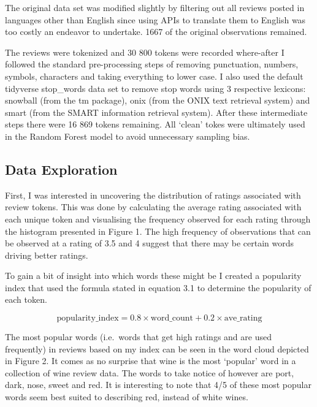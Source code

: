\documentclass[11pt,preprint]{elsarticle}
\numberwithin{equation}{section}
\numberwithin{figure}{section}
\numberwithin{table}{section}
\begin{document}
The original data set was modified slightly by filtering out all reviews
posted in languages other than English since using APIs to translate
them to English was too costly an endeavor to undertake. 1667 of the
original observations remained.

The reviews were tokenized and 30 800 tokens were recorded where-after I
followed the standard pre-processing steps of removing punctuation,
numbers, symbols, characters and taking everything to lower case. I also
used the default tidyverse stop\_words data set to remove stop words
using 3 respective lexicons: snowball (from the tm package), onix (from
the ONIX text retrieval system) and smart (from the SMART information
retrieval system). After these intermediate steps there were 16 869
tokens remaining. All `clean' tokes were ultimately used in the Random
Forest model to avoid unnecessary sampling bias.

\subsection{Data Exploration}\label{data-exploration}

First, I was interested in uncovering the distribution of ratings
associated with review tokens. This was done by calculating the average
rating associated with each unique token and visualising the frequency
observed for each rating through the histogram presented in Figure 1.
The high frequency of observations that can be observed at a rating of
3.5 and 4 suggest that there may be certain words driving better
ratings.

To gain a bit of insight into which words these might be I created a
popularity index that used the formula stated in equation 3.1 to
determine the popularity of each token.

\begin{equation}
    \text{popularity\_index} = 0.8 \times \text{word\_count} + 0.2 \times \text{ave\_rating}
\end{equation}

The most popular words (i.e.~words that get high ratings and are used
frequently) in reviews based on my index can be seen in the word cloud
depicted in Figure 2. It comes as no surprise that wine is the most
`popular' word in a collection of wine review data. The words to take
notice of however are port, dark, nose, sweet and red. It is interesting
to note that 4/5 of these most popular words seem best suited to
describing red, instead of white wines.
\end{document}
